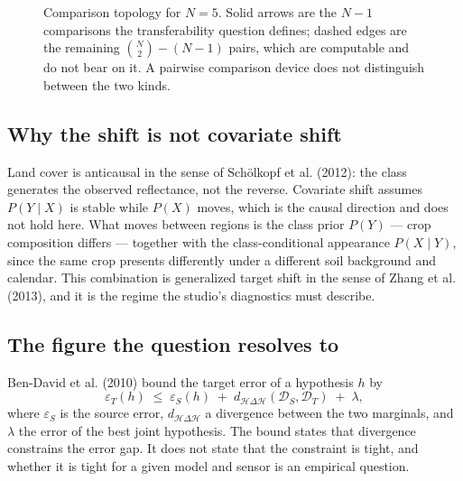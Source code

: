 \documentclass[11pt,a4paper]{article}
\begin{document}
\begin{figure}[t]
\centering
{}
\caption{Comparison topology for $N=5$. Solid arrows are the $N-1$ comparisons
the transferability question defines; dashed edges are the remaining
$\binom{N}{2}-(N-1)$ pairs, which are computable and do not bear on it. A
pairwise comparison device does not distinguish between the two kinds.}
\label{fig:star}
\end{figure}

\subsection{Why the shift is not covariate shift}

Land cover is anticausal in the sense of Sch\"olkopf et al. (2012): the class
generates the observed reflectance, not the reverse. Covariate shift assumes
$P(Y \mid X)$ is stable while $P(X)$ moves, which is the causal direction and
does not hold here. What moves between regions is the class prior $P(Y)$ ---
crop composition differs --- together with the class-conditional appearance
$P(X \mid Y)$, since the same crop presents differently under a different soil
background and calendar. This combination is generalized target shift in the
sense of Zhang et al. (2013), and it is the regime the studio's diagnostics
must describe.

\subsection{The figure the question resolves to}

Ben-David et al. (2010) bound the target error of a hypothesis $h$ by
\begin{equation}
\varepsilon_T(h) \;\le\; \varepsilon_S(h)
\;+\; d_{\mathcal{H}\Delta\mathcal{H}}(\mathcal{D}_S,\mathcal{D}_T)
\;+\; \lambda ,
\label{eq:bound}
\end{equation}
where $\varepsilon_S$ is the source error, $d_{\mathcal{H}\Delta\mathcal{H}}$ a
divergence between the two marginals, and $\lambda$ the error of the best joint
hypothesis. The bound states that divergence constrains the error gap. It does
not state that the constraint is tight, and whether it is tight for a given
model and sensor is an empirical question.
\end{document}
